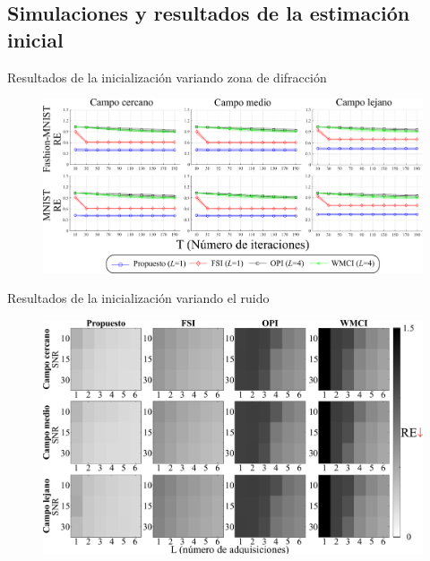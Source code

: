 \documentclass[aspectratio=169,t,xcolor=table]{beamer}
\begin{document}
\subsection{Simulaciones y resultados de la estimación inicial}
\begin{frame}{Resultados de la inicialización variando zona de difracción}
    \begin{figure}
        \centering
        \includegraphics[width=\linewidth]{images/resultados/results_initializations.pdf}
    \end{figure}
\end{frame}


\begin{frame}{Resultados de la inicialización variando el ruido}
    \begin{figure}
        \centering
        \includegraphics[height=0.75\textheight]{images/resultados/Noisy_Initializations.pdf}
    \end{figure}
\end{frame}
\end{document}
